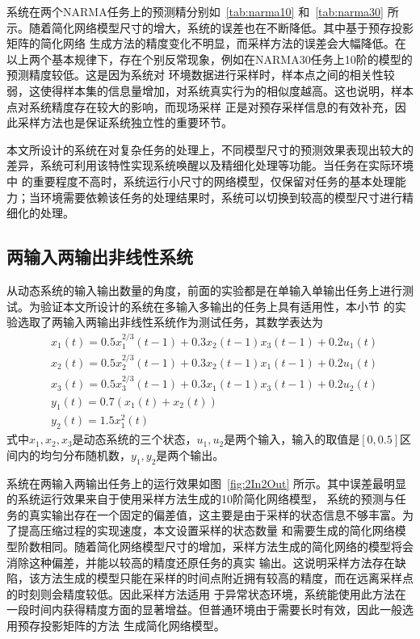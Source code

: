 系统在两个NARMA任务上的预测精分别如~\ref{tab:narma10} 和~\ref{tab:narma30} 所示。随着简化网络模型尺寸的增大，系统的误差也在不断降低。其中基于预存投影矩阵的简化网络
生成方法的精度变化不明显，而采样方法的误差会大幅降低。在以上两个基本规律下，存在个别反常现象，例如在NARMA30任务上10阶的模型的预测精度较低。这是因为系统对
环境数据进行采样时，样本点之间的相关性较弱，这使得样本集的信息量增加，对系统真实行为的相似度越高。这也说明，样本点对系统精度存在较大的影响，而现场采样
正是对预存采样信息的有效补充，因此采样方法也是保证系统独立性的重要环节。

本文所设计的系统在对复杂任务的处理上，不同模型尺寸的预测效果表现出较大的差异，系统可利用该特性实现系统唤醒以及精细化处理等功能。当任务在实际环境中
的重要程度不高时，系统运行小尺寸的网络模型，仅保留对任务的基本处理能力；当环境需要依赖该任务的处理结果时，系统可以切换到较高的模型尺寸进行精细化的处理。

\subsection{两输入两输出非线性系统}
从动态系统的输入输出数量的角度，前面的实验都是在单输入单输出任务上进行测试。为验证本文所设计的系统在多输入多输出的任务上具有适用性，本小节
的实验选取了两输入两输出非线性系统作为测试任务，其数学表达为
\begin{equation}
	\begin{split}
		&x_1(t) = 0.5x_1^{2/3}(t-1) + 0.3x_2(t-1)x_3(t-1) + 0.2u_1(t)	\\
		&x_2(t) = 0.5x_2^{2/3}(t-1) + 0.3x_2(t-1)x_1(t-1) + 0.2u_1(t)	\\
		&x_3(t) = 0.5x_3^{2/3}(t-1) + 0.3x_1(t-1)x_3(t-1) + 0.2u_2(t)	\\
		&y_1(t) = 0.7(x_1(t) + x_2(t))									\\
		&y_2(t) = 1.5x_1^{2}(t)	
	\end{split}
\label{eq:2In2Out}
\end{equation}
式中\(x_1,x_2,x_3\)是动态系统的三个状态，\(u_1,u_2\)是两个输入，输入的取值是\([0,0.5]\)区间内的均匀分布随机数，\(y_1,y_2\)是两个输出。

系统在两输入两输出任务上的运行效果如图~\ref{fig:2In2Out} 所示。其中误差最明显的系统运行效果来自于使用采样方法生成的10阶简化网络模型，
系统的预测与任务的真实输出存在一个固定的偏差值，这主要是由于采样的状态信息不够丰富。为了提高压缩过程的实现速度，本文设置采样的状态数量
和需要生成的简化网络模型阶数相同。随着简化网络模型尺寸的增加，采样方法生成的简化网络的模型将会消除这种偏差，并能以较高的精度还原任务的真实
输出。这说明采样方法存在缺陷，该方法生成的模型只能在采样的时间点附近拥有较高的精度，而在远离采样点的时刻则会精度较低。因此采样方法适用
于异常状态环境，系统能使用此方法在一段时间内获得精度方面的显著增益。但普通环境由于需要长时有效，因此一般选用预存投影矩阵的方法
生成简化网络模型。

